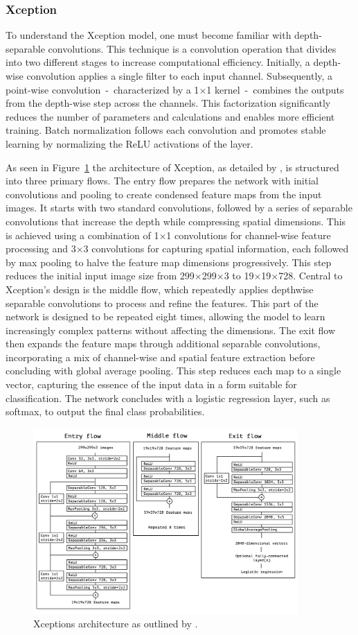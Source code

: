 \subsubsection{Xception}\label{xception}

To understand the Xception model, one must become familiar with depth-separable convolutions. This technique is a convolution operation that divides into two different stages to increase computational efficiency. Initially, a depth-wise convolution applies a single filter to each input channel. Subsequently, a point-wise convolution~-~characterized by a 1$\times$1 kernel~-~combines the outputs from the depth-wise step across the channels. This factorization significantly reduces the number of parameters and calculations and enables more efficient training. Batch normalization follows each convolution and promotes stable learning by normalizing the ReLU activations of the layer.

As seen in Figure~\ref{fig:xceptionArchitecture} the architecture of Xception, as detailed by \citep{chollet2017xception}, is structured into three primary flows. The entry flow prepares the network with initial convolutions and pooling to create condensed feature maps from the input images. It starts with two standard convolutions, followed by a series of separable convolutions that increase the depth while compressing spatial dimensions. This is achieved using a combination of 1$\times$1 convolutions for channel-wise feature processing and 3$\times$3 convolutions for capturing spatial information, each followed by max pooling to halve the feature map dimensions progressively. This step reduces the initial input image size from 299$\times$299$\times$3 to 19$\times$19$\times$728. Central to Xception's design is the middle flow, which repeatedly applies depthwise separable convolutions to process and refine the features. This part of the network is designed to be repeated eight times, allowing the model to learn increasingly complex patterns without affecting the dimensions. The exit flow then expands the feature maps through additional separable convolutions, incorporating a mix of channel-wise and spatial feature extraction before concluding with global average pooling. This step reduces each map to a single vector, capturing the essence of the input data in a form suitable for classification. The network concludes with a logistic regression layer, such as softmax, to output the final class probabilities.

\begin{figure}[t]
    \centering
    \includegraphics[width=0.9\textwidth]{figures/xception_architecture.png}
    \caption{Xceptions architecture as outlined by \citeauthor{chollet2017xception}.}\label{fig:xceptionArchitecture}
\end{figure}